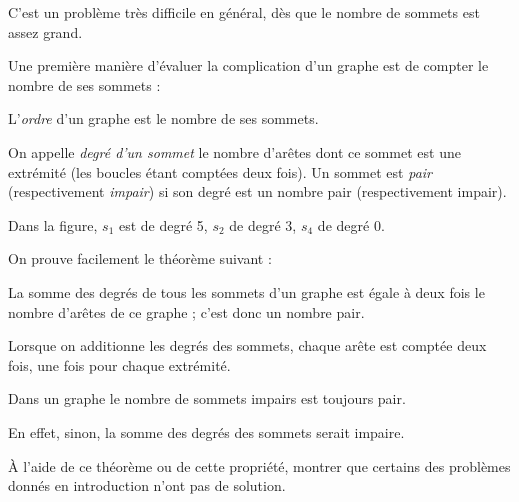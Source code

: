 \documentclass[french]{book}
\begin{document}
\begin{rem} C'est un problème très difficile en général, dès que le nombre de sommets est assez
grand.
\end{rem}

Une première manière d'évaluer la complication d'un graphe est de compter le nombre de ses
sommets :

\begin{defn} L'\emph{ordre} d'un graphe est le nombre de ses sommets.\end{defn}

\begin{defn} On appelle \emph{degré d'un sommet} le nombre d'arêtes dont ce sommet est une extrémité (les boucles étant comptées deux fois). Un sommet est \emph{pair} (respectivement \emph{impair}) si son degré est un nombre pair (respectivement impair). \end{defn}

\begin{exemple} Dans la figure, $s_1$ est de degré 5, $s_2$ de degré 3, $s_4$ de degré 0. \end{exemple}


On prouve facilement le théorème suivant :

\begin{thm} La somme des degrés de tous les sommets d'un graphe est égale à deux fois le nombre d'arêtes de ce graphe ; c'est donc un nombre pair. \end{thm}

\begin{demo} Lorsque on additionne les degrés des sommets, chaque arête est comptée deux fois, une fois pour chaque extrémité. \end{demo}

\begin{prop} Dans un graphe le nombre de sommets impairs est toujours pair. \end{prop}

\begin{demo} En effet, sinon, la somme des degrés des sommets serait impaire. \end{demo}

\begin{exo} À l'aide de ce théorème ou de cette propriété, montrer que certains des problèmes donnés en introduction n'ont pas de solution. \end{exo}

\end{document}
